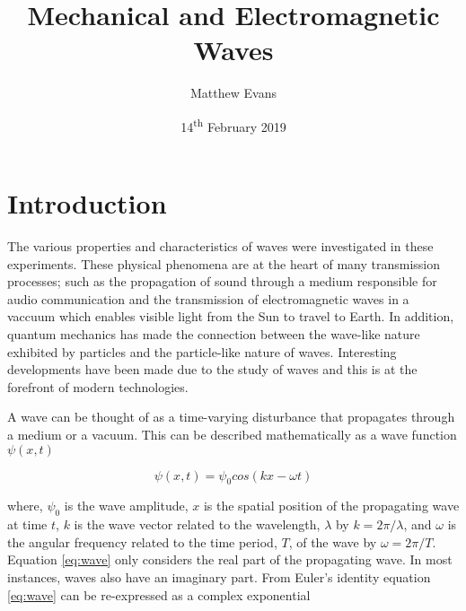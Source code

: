 \documentclass{article}
\begin{document}
\title{Mechanical and Electromagnetic Waves} %
\author{Matthew Evans}%
\date{14\textsuperscript{th} February 2019} %
\maketitle %



\section{Introduction}
\label{sec:introduction}

The various properties and characteristics of waves were investigated in these experiments. These physical phenomena are at the heart of many transmission processes; such as the propagation of sound through a medium responsible for audio communication and the transmission of electromagnetic waves in a vaccuum which enables visible light from the Sun to travel to Earth. In addition, quantum mechanics has made the connection between the wave-like nature exhibited by particles and the particle-like nature of waves. Interesting developments have been made due to the study of waves and this is at the forefront of modern technologies.

\vspace{2mm}
\noindent
A wave can be thought of as a time-varying disturbance that propagates through a medium or a vacuum. This can be described mathematically as a wave function $\psi(x, t)$

\begin{equation}
\label{eq:wave}
\psi(x, t) = \psi_0 cos(kx - \omega t)
\end{equation}

\vspace{2mm}
\noindent
where, $\psi_0$ is the wave amplitude, $x$ is the spatial position of the propagating wave at time $t$, $k$ is the wave vector related to the wavelength, $\lambda$ by $k = 2\pi / {\lambda}$, and $\omega$ is the angular frequency related to the time period, $T$, of the wave by $\omega = {2\pi} / {T}$. Equation \eqref{eq:wave} only considers the real part of the propagating wave. In most instances, waves also have an imaginary part. From Euler's identity equation \eqref{eq:wave} can be re-expressed as a complex exponential
\end{document}
